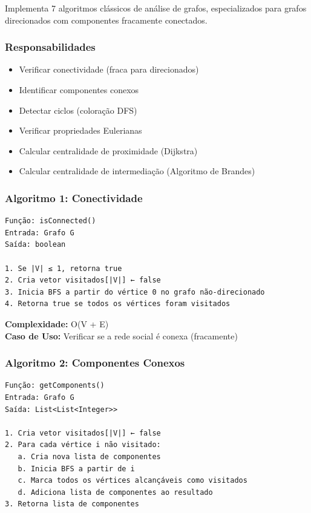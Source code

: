 \documentclass[12pt,a4paper]{article}
\begin{document}
Implementa 7 algoritmos clássicos de análise de grafos, especializados para grafos direcionados com componentes fracamente conectados.

\subsubsection{Responsabilidades}

\begin{itemize}
    \item Verificar conectividade (fraca para direcionados)
    \item Identificar componentes conexos
    \item Detectar ciclos (coloração DFS)
    \item Verificar propriedades Eulerianas
    \item Calcular centralidade de proximidade (Dijkstra)
    \item Calcular centralidade de intermediação (Algoritmo de Brandes)
\end{itemize}

\subsubsection{Algoritmo 1: Conectividade}

\begin{verbatim}
Função: isConnected()
Entrada: Grafo G
Saída: boolean

1. Se |V| ≤ 1, retorna true
2. Cria vetor visitados[|V|] ← false
3. Inicia BFS a partir do vértice 0 no grafo não-direcionado
4. Retorna true se todos os vértices foram visitados
\end{verbatim}

\textbf{Complexidade:} O(V + E) \\
\textbf{Caso de Uso:} Verificar se a rede social é conexa (fracamente)

\subsubsection{Algoritmo 2: Componentes Conexos}

\begin{verbatim}
Função: getComponents()
Entrada: Grafo G
Saída: List<List<Integer>>

1. Cria vetor visitados[|V|] ← false
2. Para cada vértice i não visitado:
   a. Cria nova lista de componentes
   b. Inicia BFS a partir de i
   c. Marca todos os vértices alcançáveis como visitados
   d. Adiciona lista de componentes ao resultado
3. Retorna lista de componentes
\end{verbatim}
\end{document}
